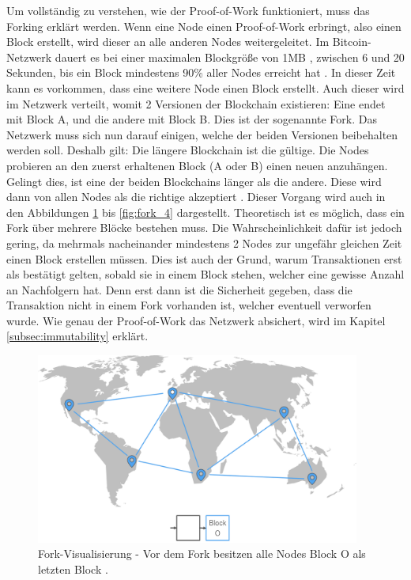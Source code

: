 Um vollständig zu verstehen, wie der Proof-of-Work funktioniert, muss das Forking erklärt werden. Wenn eine Node einen Proof-of-Work erbringt, also einen Block erstellt, wird dieser an alle anderen Nodes weitergeleitet. Im Bitcoin-Netzwerk dauert es bei einer maximalen Blockgröße von 1MB \cite{AntonopoulosMasteringbitcoin2015}, zwischen 6 und 20 Sekunden, bis ein Block mindestens 90\% aller Nodes erreicht hat \cite{BitcoinStatsb}. In dieser Zeit kann es vorkommen, dass eine weitere Node einen Block erstellt. Auch dieser wird im Netzwerk verteilt, womit 2 Versionen der Blockchain existieren: Eine endet mit Block A, und die andere mit Block B. Dies ist der sogenannte Fork. Das Netzwerk muss sich nun darauf einigen, welche der beiden Versionen beibehalten werden soll. Deshalb gilt: Die längere Blockchain ist die gültige. Die Nodes probieren an den zuerst erhaltenen Block (A oder B) einen neuen anzuhängen. Gelingt dies, ist eine der beiden Blockchains länger als die andere. Diese wird dann von allen Nodes als die richtige akzeptiert \cite{AntonopoulosMasteringbitcoin2015}. Dieser Vorgang wird auch in den Abbildungen \ref{fig:fork_1} bis \ref{fig:fork_4} dargestellt. Theoretisch ist es möglich, dass ein Fork über mehrere Blöcke bestehen muss. Die Wahrscheinlichkeit dafür ist jedoch gering, da mehrmals nacheinander mindestens 2 Nodes zur ungefähr gleichen Zeit einen Block erstellen müssen. Dies ist auch der Grund, warum Transaktionen erst als bestätigt gelten, sobald sie in einem Block stehen, welcher eine gewisse Anzahl an Nachfolgern hat. Denn erst dann ist die Sicherheit gegeben, dass die Transaktion nicht in einem Fork vorhanden ist, welcher eventuell verworfen wurde. Wie genau der Proof-of-Work das Netzwerk absichert, wird im Kapitel \ref{subsec:immutability} erklärt.


\begin{figure}[htb]
  \centering
    \includegraphics[width=0.95\textwidth,angle=0]{images/fork_1}
 	\caption{Fork-Visualisierung - Vor dem Fork besitzen alle Nodes Block O als letzten Block \cite{AntonopoulosMasteringbitcoin2015}.}
	\label{fig:fork_1}
\end{figure}

